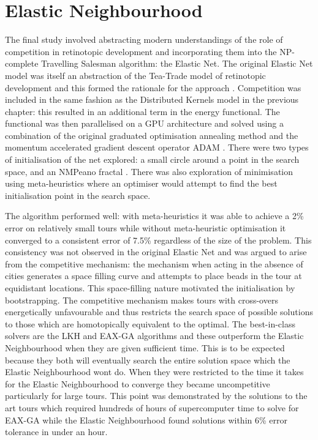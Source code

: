 \section{Elastic Neighbourhood}
The final study involved abstracting modern understandings of the role of competition in retinotopic development and incorporating them into the NP-complete Travelling Salesman algorithm: the Elastic Net. The original Elastic Net model was itself an abstraction of the Tea-Trade model of retinotopic development and this formed the rationale for the approach \cite{Durbin1987-ki, Willshaw1976-ew}. Competition was included in the same fashion as the Distributed Kernels model in the previous chapter: this resulted in an additional term in the energy functional. The functional was then parallelised on a GPU architecture and solved using a combination of the original graduated optimisation annealing method and the momentum accelerated gradient descent operator ADAM \cite{kingma2017adam}. There were two types of initialisation of the net explored: a small circle around a point in the search space, and an NMPeano fractal \cite{Moscato1994-nf}. There was also exploration of minimisation using meta-heuristics where an optimiser would attempt to find the best initialisation point in the search space. 

The algorithm performed well: with meta-heuristics it was able to achieve a 2\% error on relatively small tours while without meta-heuristic optimisation it converged to a consistent error of 7.5\% regardless of the size of the problem. This consistency was not observed in the original Elastic Net and was argued to arise from the competitive mechanism: the mechanism when acting in the absence of cities generates a space filling curve and attempts to place beads in the tour at equidistant locations. This space-filling nature motivated the initialisation by bootstrapping. The competitive mechanism makes tours with cross-overs energetically unfavourable and thus restricts the search space of possible solutions to those which are homotopically equivalent to the optimal. The best-in-class solvers are the LKH and EAX-GA algorithms and these outperform the Elastic Neighbourhood when they are given sufficient time. This is to be expected because they both will eventually search the entire solution space which the Elastic Neighbourhood wont do. When they were restricted to the time it takes for the Elastic Neighbourhood to converge they became uncompetitive particularly for large tours. This point was demonstrated by the solutions to the art tours which required hundreds of hours of supercomputer time to solve for EAX-GA while the Elastic Neighbourhood found solutions within 6\% error tolerance in under an hour.

